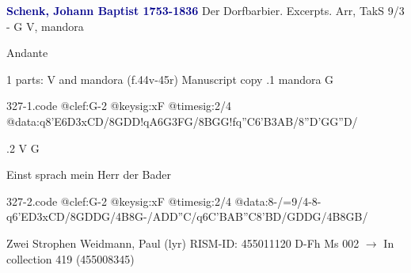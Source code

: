 \documentclass[twocolumn]{book}
\begin{document}
\newline \par \vspace{7pt} \textcolor{darkblue}{\textbf{Schenk, Johann Baptist  1753-1836}}
\newline Der Dorfbarbier. Excerpts. Arr, TakS 9/3 - G
\newline V, mandora
\newline \begin{itshape}[at left, f.44v:] Andante\end{itshape} 
\newline \textcolor{darkblue}{}  1 parts: V and mandora  (f.44v-45r)
\newline Manuscript copy
.1  mandora  G  
\begin{filecontents*}{327-1.code}
@clef:G-2
@keysig:xF
@timesig:2/4
@data:q8'E{6D3xCD}/{8GDD}!qA{6G3FG}/{8BGG}!fq''C{6'B3AB}/{8''D'GG''D}/
\end{filecontents*}
\newline
%

.2  V  G
\newline \begin{footnotesize} Einst sprach mein Herr der Bader \end{footnotesize}  
\begin{filecontents*}{327-2.code}
@clef:G-2
@keysig:xF
@timesig:2/4
@data:8-/=9/4-8-q6'E{D3xCD}/{8GDDG}/4B8G-/{ADD''C}/q6C{'BAB''C}{8'BD}/{GDDG}/4B{8GB}/
\end{filecontents*}
\newline
%

\newline Zwei Strophen
\newline Weidmann, Paul  (lyr)
\newline RISM-ID: 455011120
\newline D-Fh  Ms 002
\newline $\rightarrow$ In collection 419 (455008345)
      
\end{document}
